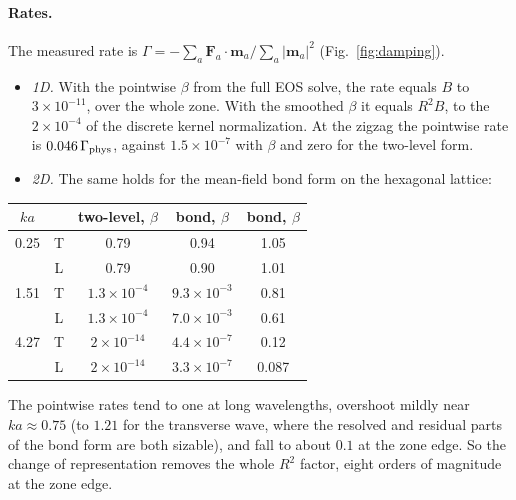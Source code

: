 \documentclass[11pt,aps,preprint,nofootinbib,superscriptaddress,tightenlines]{revtex4-2}
\def\Fig#1{Fig.~\ref{#1}}
\let\oldparagraph\paragraph
\renewcommand{\paragraph}{\par\bigskip\oldparagraph}
\begin{document}
\paragraph{Rates.}  The measured rate is
$\Gamma=-\sum_a\bm F_a\cdot\bm m_a/\sum_a|\bm m_a|^2$ (\Fig{fig:damping}).
\begin{itemize}
\item \emph{1D.}  With the pointwise $\beta$ from the full EOS solve, the rate
  equals $B$ to $3\times10^{-11}$, over the whole zone.  With the smoothed
  $\beta$ it equals $R^2B$, to the $2\times10^{-4}$ of the discrete kernel
  normalization.  At the zigzag the pointwise rate is $0.046\,\Gamma_{\rm phys}$,
  against $1.5\times10^{-7}$ with $\beta$ and zero for the two-level form.
\item \emph{2D.}  The same holds for the mean-field bond form on the hexagonal
  lattice:
\end{itemize}
\begin{center}
\begin{tabular}{c c | c c c}
\hline\hline
$ka$ & & two-level, $\beta$ & bond, $\beta$ & bond, $\beta$\\
\hline
0.25 & T & 0.79 & 0.94 & 1.05\\
     & L & 0.79 & 0.90 & 1.01\\
1.51 & T & $1.3\times10^{-4}$ & $9.3\times10^{-3}$ & 0.81\\
     & L & $1.3\times10^{-4}$ & $7.0\times10^{-3}$ & 0.61\\
4.27 & T & $2\times10^{-14}$ & $4.4\times10^{-7}$ & 0.12\\
     & L & $2\times10^{-14}$ & $3.3\times10^{-7}$ & 0.087\\
\hline\hline
\end{tabular}
\end{center}
The pointwise rates tend to one at long wavelengths, overshoot mildly near
$ka\approx0.75$ (to $1.21$ for the transverse wave, where the resolved and
residual parts of the bond form are both sizable), and fall to about $0.1$ at
the zone edge.  So the change of representation removes the whole $R^2$ factor,
eight orders of magnitude at the zone edge.
\end{document}
